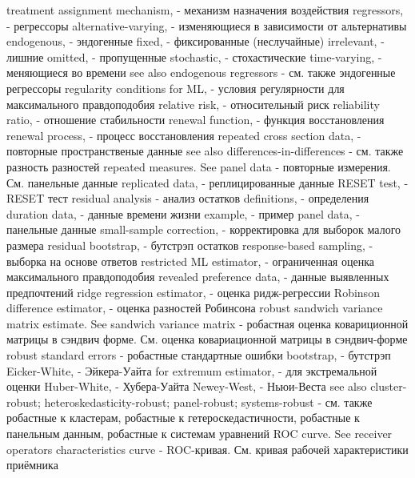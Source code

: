 treatment assignment mechanism, - механизм назначения воздействия
regressors, - регрессоры
alternative-varying, - изменяющиеся в зависимости от альтернативы
endogenous, - эндогенные
fixed, - фиксированные (неслучайные)
irrelevant, - лишние
omitted, - пропущенные
stochastic, - стохастические
time-varying, - меняющиеся во времени
see also endogenous regressors - см. также эндогенные регрессоры
regularity conditions for ML, - условия регулярности для максимального правдоподобия
relative risk, - относительный риск
reliability ratio, - отношение стабильности
renewal function, - функция восстановления
renewal process, - процесс восстановления
repeated cross section data, - повторные пространственые данные
see also differences-in-differences - см. также разность разностей
repeated measures. See panel data - повторные измерения. См. панельные данные
replicated data, - реплицированные данные
RESET test, - RESET тест
residual analysis - анализ остатков
definitions, - определения
duration data, - данные времени жизни
example, - пример
panel data, - панельные данные
small-sample correction, - корректировка для выборок малого размера
residual bootstrap, - бутстрэп остатков
response-based sampling, - выборка на основе ответов
restricted ML estimator, - ограниченная оценка максимального правдоподобия
revealed preference data, - данные выявленных предпочтений
ridge regression estimator, - оценка ридж-регрессии
Robinson difference estimator, - оценка разностей Робинсона
robust sandwich variance matrix estimate. See sandwich variance matrix - робастная оценка ковариционной матрицы в сэндвич форме. См. оценка ковариационной матрицы в сэндвич-форме
robust standard errors - робастные стандартные ошибки
bootstrap, - бутстрэп
Eicker-White, - Эйкера-Уайта
for extremum estimator, - для экстремальной оценки
Huber-White, - Хубера-Уайта
Newey-West, - Ньюи-Веста
see also cluster-robust; heteroskedasticity-robust; panel-robust; systems-robust - см. также робастные к кластерам, робастные к гетероскедастичности, робастные к панельным данным, робастные к системам уравнений
ROC curve. See receiver operators characteristics curve - ROC-кривая. См. кривая рабочей характеристики приёмника

